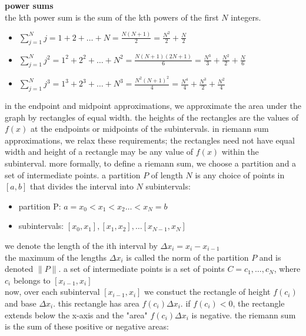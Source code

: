 \documentclass{article}
\begin{document}
\textbf{power sums}\\
the kth power sum is the sum of the kth powers of the first $N$ integers.\\
	\begin{itemize}
		\item $\sum_{j=1}^{N}j = 1 + 2 + \ldots + N = \frac{N(N + 1)}{2} = \frac{N^2}{2} + \frac{N}{2}$
		\item $\sum_{j=1}^{N}j^2 = 1^2 + 2^2 + \ldots + N^2 = \frac{N(N + 1)(2N + 1)}{6} = \frac{N^3}{3} + \frac{N^2}{2} + \frac{N}{6}$ 
		\item $\sum_{j=1}^{N}j^3 = 1^3 + 2^3 + \ldots + N^3 = \frac{N^2(N + 1)^2}{4} = \frac{N^4}{4} + \frac{N^3}{2} + \frac{N^2}{4}$ 
	\end{itemize}

in the endpoint and midpoint approximations, we approximate the area under the graph by rectangles of equal width. the heights of the rectangles are the values of $f(x)$ at the endpoints or midpoints of the subintervals. in riemann sum approximations, we relax these requirements; the rectangles need not have equal width and height of a rectangle may be any value of $f(x)$ within the subinterval. more formally, to define a riemann sum, we choose a partition and a set of intermediate points. a partition $P$ of length $N$ is any choice of points in $[a, b]$ that divides the interval into $N$ subintervals:
	\begin{itemize}
		\item partition P: $a = x_0 < x_1 < x_2 \ldots < x_N = b$
		\item subintervals: $[x_0, x_1], [x_1, x_2], \ldots [x_{N-1}, x_{N}]$
	\end{itemize}

we denote the length of the ith interval by $\Delta x_i =  x_i - x_{i-1}$\\

the maximum of the lengths $\Delta x_i$ is called the norm of the partition $P$ and is denoted $\lVert P\rVert$. a set of intermediate points is a set of points $C = {c_1, \ldots, c_N}$, where $c_i$ belongs to $[x_{i-1}, x_i]$\\

now, over each subinterval $[x_{i-1}, x_i]$ we constuct the rectangle of height $f(c_i)$ and base $\Delta x_i$. this rectangle has area $f(c_i)\Delta x_i$. if $f(c_i) < 0$, the rectangle extends below the x-axis and the "area" $f(c_i)\Delta x_i$ is negative. the riemann sum is the sum of these positive or negative areas:\\
\end{document}
